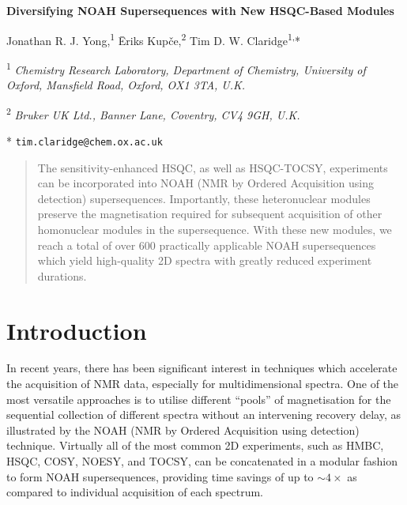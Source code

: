 \documentclass[11pt]{article}
\newcommand*{\proton}{\ce{^{1}H}}
\begin{document}
\begin{center}
    \Large \textbf{Diversifying NOAH Supersequences with New HSQC-Based Modules}

    \vspace{0.2cm}

    \large Jonathan R. J. Yong,\textsuperscript{1} {\=E}riks Kup{\v{c}}e,\textsuperscript{2} Tim D. W. Claridge\textsuperscript{1,}*

    \vspace{0.2cm}

    \normalsize

    \textsuperscript{1} \textit{Chemistry Research Laboratory, Department of Chemistry, University of Oxford, Mansfield Road, Oxford, OX1 3TA, U.K.}

    \textsuperscript{2} \textit{Bruker UK Ltd., Banner Lane, Coventry, CV4 9GH, U.K.}

    * \texttt{tim.claridge@chem.ox.ac.uk}
\end{center}

\vspace{0.5cm}

\begin{abstract}
    The sensitivity-enhanced HSQC, as well as HSQC-TOCSY, experiments can be incorporated into NOAH (NMR by Ordered Acquisition using \proton{} detection) supersequences.
    Importantly, these heteronuclear modules preserve the magnetisation required for subsequent acquisition of other homonuclear modules in the supersequence.
    With these new modules, we reach a total of over 600 practically applicable NOAH supersequences which yield high-quality 2D spectra with greatly reduced experiment durations.
\end{abstract}

\section*{Introduction}

In recent years, there has been significant interest in techniques which accelerate the acquisition of NMR data, especially for multidimensional spectra.\autocite{ultrafast, timeshared, multireceive}
One of the most versatile approaches is to utilise different ``pools'' of magnetisation for the sequential collection of different spectra without an intervening recovery delay, as illustrated by the NOAH (NMR by Ordered Acquisition using \proton{} detection) technique.\autocite{noah}
Virtually all of the most common 2D experiments, such as HMBC, HSQC, COSY, NOESY, and TOCSY, can be concatenated in a modular fashion to form NOAH supersequences, providing time savings of up to $\sim 4\times$ as compared to individual acquisition of each spectrum.
\end{document}
